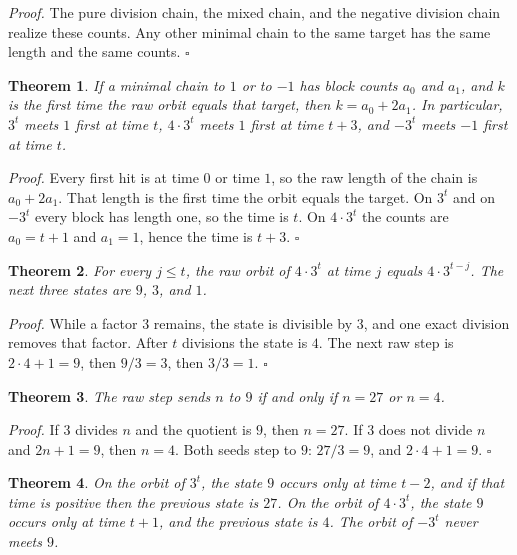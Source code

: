 \documentclass[11pt,letterpaper]{article}
\newtheorem{theorem}{Theorem}
\newenvironment{proof}{\noindent\textit{Proof.}}{\hfill\(\square\)}
\begin{document}
\begin{proof}
The pure division chain, the mixed chain, and the negative division chain realize these counts. Any other minimal chain to the same target has the same length and the same counts.
\end{proof}

\begin{theorem}
\label{thm:rawtime}
If a minimal chain to \(1\) or to \(-1\) has block counts \(a_{0}\) and \(a_{1}\), and \(k\) is the first time the raw orbit equals that target, then \(k=a_{0}+2a_{1}\). In particular, \(3^{t}\) meets \(1\) first at time \(t\), \(4\cdot 3^{t}\) meets \(1\) first at time \(t+3\), and \(-3^{t}\) meets \(-1\) first at time \(t\).
\end{theorem}

\begin{proof}
Every first hit is at time \(0\) or time \(1\), so the raw length of the chain is \(a_{0}+2a_{1}\). That length is the first time the orbit equals the target. On \(3^{t}\) and on \(-3^{t}\) every block has length one, so the time is \(t\). On \(4\cdot 3^{t}\) the counts are \(a_{0}=t+1\) and \(a_{1}=1\), hence the time is \(t+3\).
\end{proof}

\begin{theorem}
\label{thm:mixedorbit}
For every \(j\le t\), the raw orbit of \(4\cdot 3^{t}\) at time \(j\) equals \(4\cdot 3^{t-j}\). The next three states are \(9\), \(3\), and \(1\).
\end{theorem}

\begin{proof}
While a factor \(3\) remains, the state is divisible by \(3\), and one exact division removes that factor. After \(t\) divisions the state is \(4\). The next raw step is \(2\cdot 4+1=9\), then \(9/3=3\), then \(3/3=1\).
\end{proof}

\begin{theorem}
\label{thm:nine}
The raw step sends \(n\) to \(9\) if and only if \(n=27\) or \(n=4\).
\end{theorem}

\begin{proof}
If \(3\) divides \(n\) and the quotient is \(9\), then \(n=27\). If \(3\) does not divide \(n\) and \(2n+1=9\), then \(n=4\). Both seeds step to \(9\): \(27/3=9\), and \(2\cdot 4+1=9\).
\end{proof}

\begin{theorem}
\label{thm:nineplace}
On the orbit of \(3^{t}\), the state \(9\) occurs only at time \(t-2\), and if that time is positive then the previous state is \(27\). On the orbit of \(4\cdot 3^{t}\), the state \(9\) occurs only at time \(t+1\), and the previous state is \(4\). The orbit of \(-3^{t}\) never meets \(9\).
\end{theorem}
\end{document}
